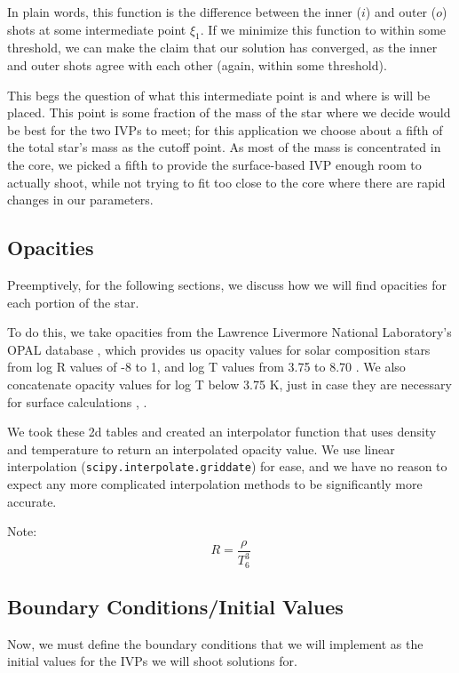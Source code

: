 \documentclass[twocolumn]{aastex631}
\begin{document}
In plain words, this function is the difference between the inner ($i$) and outer ($o$) shots at some intermediate point $\xi_1$. If we minimize this function to within some threshold, we can make the claim that our solution has converged, as the inner and outer shots agree with each other (again, within some threshold).

This begs the question of what this intermediate point is and where is will be placed. This point is some fraction of the mass of the star where we decide would be best for the two IVPs to meet; for this application we choose about a fifth of the total star's mass as the cutoff point. As most of the mass is concentrated in the core, we picked a fifth to provide the surface-based IVP enough room to actually shoot, while not trying to fit too close to the core where there are rapid changes in our parameters.


\subsection{Opacities}

Preemptively, for the following sections, we discuss how we will find opacities for each portion of the star. 

To do this, we take opacities from the Lawrence Livermore National Laboratory's OPAL database \citep{opal}, which provides us opacity values for solar composition stars from log R values of -8 to 1, and log T values from 3.75 to 8.70 \citep{opacities}. We also concatenate opacity values for log T below 3.75 K, just in case they are necessary for surface calculations \citep{asplund}, \citep{lowt}.

We took these 2d tables and created an interpolator function that uses density and temperature to return an interpolated opacity value. We use linear interpolation (\texttt{scipy.interpolate.griddate}) for ease, and we have no reason to expect any more complicated interpolation methods to be significantly more accurate.

Note:
\begin{equation}
	R = \frac{\rho}{T_6^3}
\end{equation}

\subsection{Boundary Conditions/Initial Values}

Now, we must define the boundary conditions that we will implement as the initial values for the IVPs we will shoot solutions for.
\end{document}
